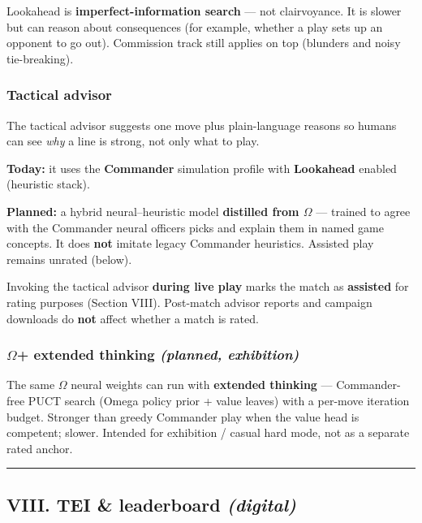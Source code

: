 \documentclass[11pt]{article}
\begin{document}
Lookahead is \textbf{imperfect-information search} --- not clairvoyance.
It is slower but can reason about consequences (for example, whether a
play sets up an opponent to go out). Commission track still applies on top
(blunders and noisy tie-breaking).

\subsubsection{Tactical advisor}\label{tactical-advisor}

The tactical advisor suggests one move plus plain-language reasons so
humans can see \emph{why} a line is strong, not only what to play.

\textbf{Today:} it uses the \textbf{Commander} simulation profile with
\textbf{Lookahead} enabled (heuristic stack).

\textbf{Planned:} a hybrid neural--heuristic model \textbf{distilled
from $\Omega$} --- trained to agree with the Commander neural
officer\textquotesingle s picks and explain them in named game concepts.
It does \textbf{not} imitate legacy Commander heuristics. Assisted play
remains unrated (below).

Invoking the tactical advisor \textbf{during live play} marks the match
as \textbf{assisted} for rating purposes (Section VIII). Post-match
advisor reports and campaign downloads do \textbf{not} affect whether a
match is rated.

\subsubsection{\texorpdfstring{$\Omega$+ extended thinking \emph{(planned,
exhibition)}}{$\Omega$+ extended thinking (planned, exhibition)}}\label{omega-plus-extended-thinking-planned-exhibition}

The same $\Omega$ neural weights can run with \textbf{extended thinking} ---
Commander-free PUCT search (Omega policy prior + value leaves) with a
per-move iteration budget. Stronger than greedy Commander play when the
value head is competent; slower. Intended for exhibition / casual hard
mode, not as a separate rated anchor.

\begin{center}\rule{0.5\linewidth}{0.5pt}\end{center}

\subsection{\texorpdfstring{VIII. TEI \& leaderboard
\emph{(digital)}}{VIII. TEI \& leaderboard (digital)}}\label{viii-tei--leaderboard-digital}
\end{document}
